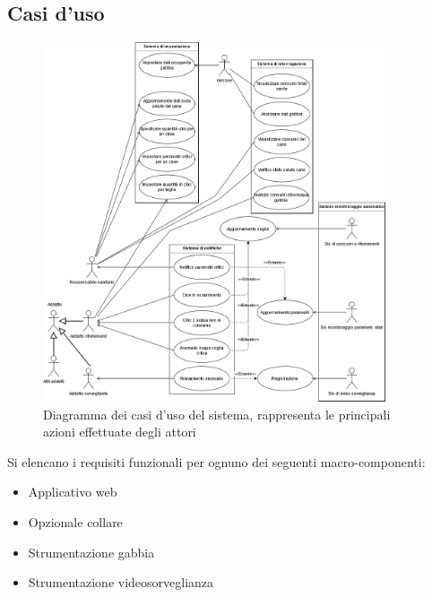 	    \subsection{Casi d'uso}
            \begin{figure}[H]
                \caption{Diagramma dei casi d'uso del sistema, rappresenta le principali azioni effettuate degli attori}
                \centering
               \includegraphics[width=0.9\textwidth]{DrawIo/useCaseWholeSystem.png}
            \end{figure}
            
    	Si elencano i requisiti funzionali per ognuno dei seguenti macro-componenti:
	    \begin{itemize}
            \item Applicativo web 
            \item Opzionale collare
            \item Strumentazione gabbia
            \item Strumentazione videosorveglianza
        \end{itemize}
        
